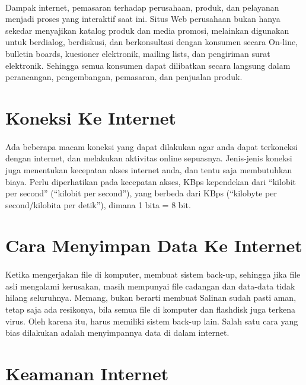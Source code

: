 \documentclass[12pt, a4paper]{article}
\begin{document}
\paragraph{} Dampak internet, pemasaran terhadap perusahaan, produk, dan pelayanan menjadi proses yang interaktif saat ini. Situs Web perusahaan bukan hanya sekedar menyajikan katalog produk dan media promosi, melainkan digunakan untuk berdialog, berdiskusi, dan berkonsultasi dengan konsumen secara On-line, bulletin boards, kuesioner elektronik, mailing lists, dan pengiriman surat elektronik. Sehingga semua konsumen dapat dilibatkan secara langsung dalam perancangan, pengembangan, pemasaran, dan penjualan produk.

\section{Koneksi Ke Internet}
\paragraph{} Ada beberapa macam koneksi yang dapat dilakukan agar anda dapat terkoneksi dengan internet, dan melakukan aktivitas online sepuasnya. Jenis-jenis koneksi juga menentukan kecepatan akses internet anda, dan tentu saja membutuhkan biaya. Perlu diperhatikan pada kecepatan akses, KBps kependekan dari “kilobit per second” (“kilobit per second”), yang berbeda dari KBps (“kilobyte per second/kilobita per detik”), dimana 1 bita = 8 bit.

\section{Cara Menyimpan Data Ke Internet}
\paragraph{} Ketika mengerjakan file di komputer, membuat sistem back-up, sehingga jika file asli mengalami kerusakan, masih mempunyai file cadangan dan data-data tidak hilang seluruhnya. Memang, bukan berarti membuat Salinan sudah pasti aman, tetap saja ada resikonya, bila semua file di komputer dan flashdisk juga terkena virus. Oleh karena itu, harus memiliki sistem back-up lain. Salah satu cara yang bias dilakukan adalah menyimpannya data di dalam internet.

\section{Keamanan Internet}
\end{document}
